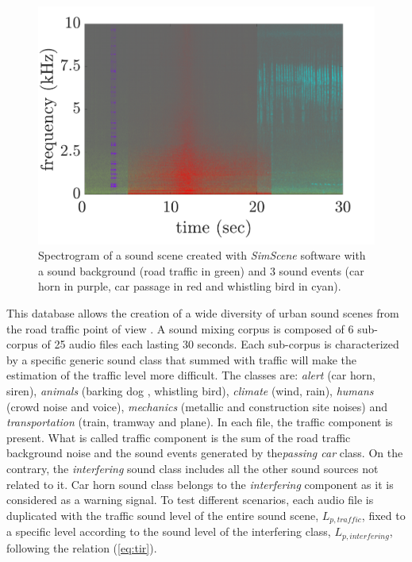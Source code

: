 \documentclass[twocolumn]{svjour3}          %
\begin{document}
\begin{figure}[t]
    \centering
       \includegraphics[width=.9\linewidth]{./figures/exampleSimScene}
    \caption{Spectrogram of a sound scene created with \textit{SimScene} software with a sound background (road traffic in green) and 3 sound events (car horn in purple, car passage in red and whistling bird in cyan).}
    \label{fig:example_simScene}
\end{figure}

This database allows the creation of a wide diversity of urban sound scenes from the road traffic point of view \cite{gloaguen_creation_2017}. A sound mixing corpus is composed of 6 sub-corpus of 25 audio files each lasting 30 seconds. Each sub-corpus is characterized by a specific generic sound class that summed with traffic will make the estimation of the traffic level more difficult. The classes are: \textit{alert} (car horn, siren), \textit{animals} (barking dog , whistling bird), \textit{climate} (wind, rain), \textit{humans} (crowd noise and voice), \textit{mechanics} (metallic and construction site noises) and \textit{transportation} (train, tramway and plane). In each file, the traffic component is present. What is called traffic component is the sum of the road traffic background noise and the sound events generated by the\textit{passing car} class. On the contrary, the \textit{interfering} sound class includes all the other sound sources not related to it. Car horn sound class belongs to the \textit{interfering} component as it is considered as a warning signal. To test different scenarios, each audio file is duplicated with the traffic sound level of the entire sound scene, $L_{p,traffic}$, fixed to a specific level according to the sound level of the interfering class, $L_{p,interfering}$,  following the relation (\ref{eq:tir}).
\end{document}
